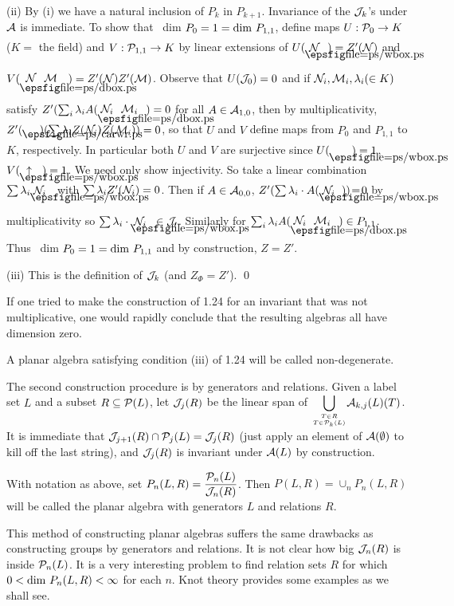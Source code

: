 (ii) By (i) we have a natural inclusion of $P_k$ in $P_{k+1}$.
Invariance of the ${\cal J}_k$'s under ${\cal A}$ is immediate.
To show that \ dim $P_0=1={\op{dim}} \ P_{1,1}$, define maps 
$U:\P_0\to K$ ($K=$ the field) and $V:\P_{1,1}\to K$ by linear extensions of
$U(\blankbox{\cal N})=Z'(\cal N)$ and 
$V(\boxarrow{{\cal N}\ \ {\cal M}}\ )= 
Z'({\cal N})Z'({\cal M})$. Observe that $U({\cal J}_0)=0$ and if
${\cal N}_i,{\cal M}_i,\lambda_i (\in K)$ satisfy
$Z'(\sum_i\lambda_i A( \boxarrow{{\cal N}_i\ \ {\cal M}_i}\ )=0$ for
all
$A\in{\cal A}_{1,0}$, then by multiplicativity,
$Z'(\caright\ )(\sum\lambda_i Z({\cal N}_i)Z({\cal M}_i))=0$,
so that $U$ and $V$ define maps from $P_0$ and $P_{1,1}$ to $K$,
respectively. In particular both $U$ and $V$ are surjective since
$U(\blankbox{})=1$, $V(\blankbox{\uparrow})=1$. We need only show
injectivity. So take a linear combination  $\sum\lambda_i\blankbox{{\cal N}_i}$ 
with $\sum\lambda_i Z'({\cal N}_i)=0$. Then if
$A\in{\cal A}_{0,0}$, $Z'(\sum\lambda_i\dt A (\blankbox{{\cal N}_i})
 )\!=\!0$ by multiplicativity so $\sum\lambda_i\dt \blankbox{{\cal N}_i}
\in\cal J_0$. Similarly for 
$\sum_i\lambda_i A(\boxarrow{{\cal N}_i\ \ {\cal M}_i}\ ) \in P_{1,1}$.

Thus \ dim $P_0=1={\op{dim}} \ P_{1,1}$ and by construction, $Z=Z'$.

(iii) This is the definition of ${\cal J}_k$ (and $Z_{\Phi}=Z'$). \qed

 If one tried to make the construction of 1.24 for
an invariant that was not multiplicative, one
would rapidly conclude that the resulting algebras all have
dimension zero.

 A planar algebra satisfying condition
(iii) of 1.24 will be called non-degenerate.

\bs The second construction procedure is by generators and
relations. Given a label set $L$ and a subset $R\subseteq \P(L)$,
let
$\J_j(R)$ be the linear span of
$\dsize{\bigcup_{T\in R \atop T\in \P_k(L)}}{\cal A}_{k,j}(L)(T)$. 
It is immediate that
$\J_{j+1}(R)\cap \P_j(L)=\J_j(R)$ (just apply an element of
${\cal A}(\emptyset)$ to kill off the last string), and $\J_j(R)$ is
invariant under ${\cal A}(L)$ by construction.

 With notation as above, set
$P_n(L,R)=\dsize{\frac{\P_n(L)}{\J_n(R)}}$. Then
$P(L,R)=\cup_n P_n(L,R)$ will be called the planar algebra with
generators $L$ and relations $R$.

This method of constructing planar algebras suffers the same
drawbacks as constructing groups by generators and relations.
It is not clear how big $\J_n(R)$ is inside $\P_n(L)$. It is a very
interesting problem to find relation sets $R$ for which
$0 < {\op{dim}} \ P_n(L,R) < \infty$ for each $n$. Knot theory
provides some examples as we shall see.

